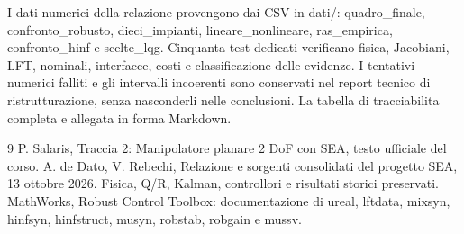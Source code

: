 \documentclass[11pt,a4paper,oneside]{report}
\begin{document}
I dati numerici della relazione provengono dai CSV in dati/: quadro\_finale,
confronto\_robusto, dieci\_impianti, lineare\_nonlineare, ras\_empirica,
confronto\_hinf e scelte\_lqg. Cinquanta test dedicati verificano fisica,
Jacobiani, LFT, nominali, interfacce, costi e classificazione delle evidenze.
I tentativi numerici falliti e gli intervalli incoerenti sono conservati
nel report tecnico di ristrutturazione, senza nasconderli nelle conclusioni.
La tabella di tracciabilita completa e allegata in forma Markdown.
\begin{thebibliography}{9}
 P. Salaris, Traccia 2: Manipolatore planare 2 DoF con SEA, testo ufficiale del corso.
 A. de Dato, V. Rebechi, Relazione e sorgenti consolidati del progetto SEA, 13 ottobre 2026. Fisica, Q/R, Kalman, controllori e risultati storici preservati.
 MathWorks, Robust Control Toolbox: documentazione di ureal, lftdata, mixsyn, hinfsyn, hinfstruct, musyn, robstab, robgain e mussv.
\end{thebibliography}
\end{document}
